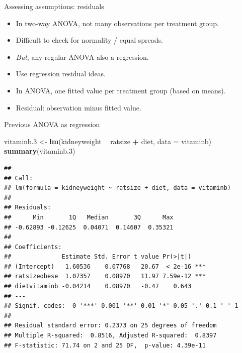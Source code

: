 \documentclass[
  ignorenonframetext,
]{beamer}
\newenvironment{Shaded}{\begin{snugshade}}{\end{snugshade}}
\newcommand{\DataTypeTok}[1]{\textcolor[rgb]{0.13,0.29,0.53}{#1}}
\newcommand{\FloatTok}[1]{\textcolor[rgb]{0.00,0.00,0.81}{#1}}
\newcommand{\KeywordTok}[1]{\textcolor[rgb]{0.13,0.29,0.53}{\textbf{#1}}}
\newcommand{\NormalTok}[1]{#1}
\newcommand{\OperatorTok}[1]{\textcolor[rgb]{0.81,0.36,0.00}{\textbf{#1}}}
\newcommand{\StringTok}[1]{\textcolor[rgb]{0.31,0.60,0.02}{#1}}
\providecommand{\tightlist}{%
  \setlength{\itemsep}{0pt}\setlength{\parskip}{0pt}}
\begin{document}
\begin{frame}{Assessing assumptions: residuals}
\protect\hypertarget{assessing-assumptions-residuals}{}

\begin{itemize}
\tightlist
\item
  In two-way ANOVA, not many observations per treatment group.
\item
  Difficult to check for normality / equal spreads.
\item
  \emph{But}, any regular ANOVA also a regression.
\item
  Use regression residual ideas.
\item
  In ANOVA, one fitted value per treatment group (based on means).
\item
  Residual: observation minus fitted value.
\end{itemize}

\end{frame}

\begin{frame}[fragile]{Previous ANOVA as regression}
\protect\hypertarget{previous-anova-as-regression}{}

\scriptsize

\begin{Shaded}
\begin{Highlighting}[]
\NormalTok{vitaminb}\FloatTok{.3}\NormalTok{ <-}\StringTok{ }\KeywordTok{lm}\NormalTok{(kidneyweight }\OperatorTok{~}\StringTok{ }\NormalTok{ratsize }\OperatorTok{+}\StringTok{ }\NormalTok{diet, }\DataTypeTok{data =}\NormalTok{ vitaminb)}
\KeywordTok{summary}\NormalTok{(vitaminb}\FloatTok{.3}\NormalTok{)}
\end{Highlighting}
\end{Shaded}

\begin{verbatim}
## 
## Call:
## lm(formula = kidneyweight ~ ratsize + diet, data = vitaminb)
## 
## Residuals:
##      Min       1Q   Median       3Q      Max 
## -0.62893 -0.12625  0.04071  0.14607  0.35321 
## 
## Coefficients:
##              Estimate Std. Error t value Pr(>|t|)    
## (Intercept)   1.60536    0.07768   20.67  < 2e-16 ***
## ratsizeobese  1.07357    0.08970   11.97 7.59e-12 ***
## dietvitaminb -0.04214    0.08970   -0.47    0.643    
## ---
## Signif. codes:  0 '***' 0.001 '**' 0.01 '*' 0.05 '.' 0.1 ' ' 1
## 
## Residual standard error: 0.2373 on 25 degrees of freedom
## Multiple R-squared:  0.8516, Adjusted R-squared:  0.8397 
## F-statistic: 71.74 on 2 and 25 DF,  p-value: 4.39e-11
\end{verbatim}

\normalsize

\end{frame}
\end{document}
